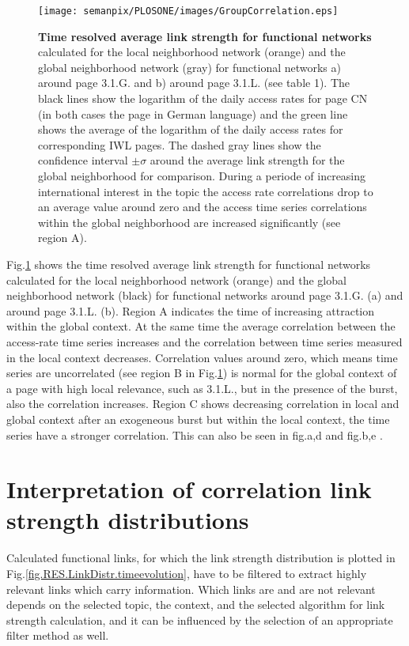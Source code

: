 \documentclass[a4paper,10pt]{scrbook}
\begin{document}
\begin{figure}[!ht]
\begin{center}
\texttt{[image: semanpix/PLOSONE/images/GroupCorrelation.eps]}
\end{center}
\caption{
{\bf Time resolved average link strength for functional networks}
calculated for the local neighborhood network (orange) and the global
neighborhood network (gray) for functional networks a) around page 3.1.G.
and b) around page 3.1.L. (see table 1). The black lines show the logarithm of
the daily access rates for page CN (in both cases the page in German language) 
and the green line shows the average of the logarithm of
the daily access rates for corresponding IWL pages. 
The dashed gray lines show the confidence interval $\pm \sigma$ around the average 
link strength for the global neighborhood for comparison. 
During a periode of increasing international interest in the topic the access rate 
correlations drop to an average value around zero and the access time series correlations 
within the global neighborhood are increased significantly (see region A). 
}
\label{fig.RES.LINKSTRENGTH}
\end{figure}

Fig.\ref{fig.RES.LINKSTRENGTH} shows the time resolved average link strength for
functional networks calculated for the local neighborhood network (orange) and
the global neighborhood network (black) for functional networks around page
3.1.G. (a) and around page 3.1.L. (b). Region A indicates the time of
increasing attraction within the global context. At the same time the average
correlation between the access-rate time series increases and the correlation
between time series measured in the local context decreases. Correlation values
around zero, which means time series are uncorrelated (see region
B in Fig.\ref{fig.RES.LINKSTRENGTH}) is normal for the global context of a
page with high local relevance, such as 3.1.L., but in the presence of the
burst, also the correlation increases. Region C shows decreasing correlation
in local and global context after an exogeneous burst but within the local
context, the time series have a stronger correlation. This can also be seen in
fig.\label{fig.RES.LinkDistr.timeevolution}a,d and
fig.\label{fig.RES.LinkDistr.timeevolution}b,e .


\section{Interpretation of correlation link strength distributions}
Calculated functional links, for which the link strength distribution is
plotted in Fig.\ref{fig.RES.LinkDistr.timeevolution}, have to be filtered to
extract highly relevant links which carry information. Which links are and are not 
relevant depends on the selected topic, the context, and the selected
algorithm for link strength calculation, and it can be influenced by the selection
of an appropriate filter method as well.
\end{document}
